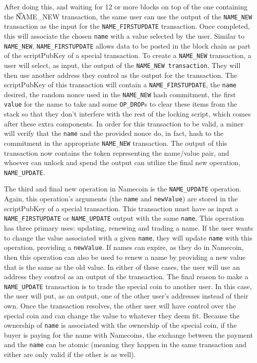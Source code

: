 After doing this, and waiting for 12 or more blocks on top of the one containing the {\t NAME\_NEW} transaction, the same user can use the output of the {\tt NAME\_NEW} transaction as the input for the {\tt NAME\_FIRSTUPDATE} transaction. Once completed, this will associate the chosen {\tt name} with a value selected by the user. Similar to {\tt NAME\_NEW}, {\tt NAME\_FIRSTUPDATE} allows data to be posted in the block chain as part of the scriptPubKey of a special transaction. 
To create a {\tt NAME\_NEW} transaction, a user will select, as input, the output of the {\tt NAME\_NEW transaction}. They will then use another address they control as the output for the transaction. The scriptPubKey of this transaction will contain a {\tt NAME\_FIRSTUPDATE}, the {\tt name} desired, the random nonce used in the {\tt NAME\_NEW} hash commitment, the first {\tt value} for the name to take and some {\tt OP\_DROP}s to clear these items from the stack so that they don't interfere with the rest of the locking script, which comes after these extra components. In order for this transaction to be valid, a miner will verify that the {\tt name} and the provided nonce do, in fact, hash to the commitment in the appropriate {\tt NAME\_NEW} transaction. The output of this transaction now contains the token representing the name/value pair, and whoever can unlock and spend the output can utilize the final new operation, {\tt NAME\_UPDATE}.

The third and final new operation in Namecoin is the {\tt NAME\_UPDATE} operation. Again, this operation's arguments (the {\tt name} and {\tt newValue}) are stored in the scriptPubKey of a special transaction. This transaction must have as input a {\tt NAME\_FIRSTUPDATE} or {\tt NAME\_UPDATE} output with the same {\tt name}. This operation has three primary uses: updating, renewing and trading a name. If the user wants to change the value associated with a given {\tt name}, they will update {\tt name} with this operation, providing a {\tt newValue}. If names can expire, as they do in Namecoin, then this operation can also be used to renew a name by providing a new value that is the same as the old value. In either of these cases, the user will use an address they control as an output of the transaction. The final reason to make a {\tt NAME\_UPDATE} transaction is to trade the special coin to another user. In this case, the user will put, as an output, one of the other user's addresses instead of their own. Once the transaction resolves, the other user will have control over the special coin and can change the value to whatever they deem fit. Because the ownership of {\tt name} is associated with the ownership of the special coin, if the buyer is paying for the name with Namecoins, the exchange between the payment and the {\tt name} can be atomic (meaning they happen in the same transaction and either are only valid if the other is as well). 

